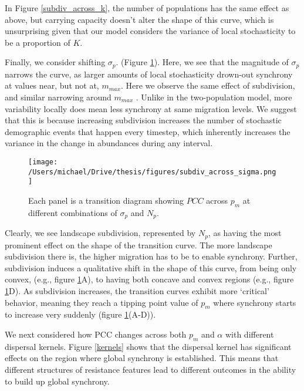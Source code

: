 In Figure \ref{subdiv_across_k}, the number of populations has the same
effect as above, but carrying capacity doesn't alter the shape of this
curve, which is unsurprising given that our model considers the variance
of local stochasticity to be a proportion of \(K\).

Finally, we consider shifting \(\sigma_p\). (Figure
\ref{subdiv_across_sigma}). Here, we see that the magnitude of
\(\sigma_p\) narrows the curve, as larger amounts of local stochasticity
drown-out synchrony at values near, but not at, \(m_{max}\). Here we
observe the same effect of subdivision, and similar narrowing around
\(m_{max}\) . Unlike in the two-population model, more variability
locally does mean less synchrony at same migration levels. We suggest
that this is because increasing subdivision increases the number of
stochastic demographic events that happen every timestep, which
inherently increases the variance in the change in abundances during any
interval.

\begin{figure}[h]

\texttt{[image: /Users/michael/Drive/thesis/figures/subdiv\_across\_sigma.png]}

\caption{Each panel is a transition diagram showing $PCC$ across $p_m$ at different combinations of $\sigma_p$ and $N_p$.}\label{subdiv_across_sigma}

\end{figure}

Clearly, we see landscape subdivision, represented by \(N_p\), as having
the most prominent effect on the shape of the transition curve. The more
landscape subdivision there is, the higher migration has to be to enable
synchrony. Further, subdivision induces a qualitative shift in the shape
of this curve, from being only convex, (e.g., figure
\ref{subdiv_across_sigma}A), to having both concave and convex regions
(e.g., figure \ref{subdiv_across_sigma}D). As subdivision increases, the
transition curves exhibit more `critical' behavior, meaning they reach a
tipping point value of \(p_m\) where synchrony starts to increase very
suddenly (figure \ref{subdiv_across_sigma}(A-D)).

We next considered how \(\text{PCC}\) changes across both \(p_m\) and
\(\alpha\) with different dispersal kernels. Figure \ref{kernels} shows
that the dispersal kernel has significant effects on the region where
global synchrony is established. This means that different structures of
resistance features lead to different outcomes in the ability to build
up global synchrony.

